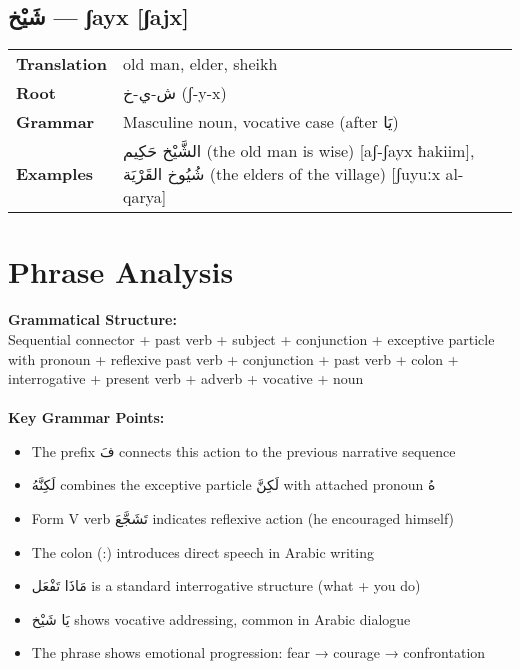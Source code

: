 \documentclass[a4paper,12pt]{article}
\begin{document}
\subsection{\textarabic{شَيْخ} — \textbf{ʃayx} [ʃajx]}
\begin{tabular}{p{3cm}p{10cm}}
\toprule
\textbf{Translation} & old man, elder, sheikh \\
\textbf{Root} & \textarabic{ش-ي-خ} (ʃ-y-x) \\
\textbf{Grammar} & Masculine noun, vocative case (after \textarabic{يَا}) \\
\textbf{Examples} & \textarabic{الشَّيْخ حَكِيم} (the old man is wise) [aʃ-ʃayx ħakiim], \textarabic{شُيُوخ القَرْيَة} (the elders of the village) [ʃuyuːx al-qarya] \\
\bottomrule
\end{tabular}

\section{Phrase Analysis}

\begin{tcolorbox}[colback=boxcolor,colframe=headercolor]
\textbf{Grammatical Structure:}\\
Sequential connector + past verb + subject + conjunction + exceptive particle with pronoun + reflexive past verb + conjunction + past verb + colon + interrogative + present verb + adverb + vocative + noun \\
\\
\textbf{Key Grammar Points:}
\begin{itemize}
\item The prefix \textarabic{فَ} connects this action to the previous narrative sequence
\item \textarabic{لَكِنَّهُ} combines the exceptive particle \textarabic{لَكِنَّ} with attached pronoun \textarabic{هُ}
\item Form V verb \textarabic{تَشَجَّعَ} indicates reflexive action (he encouraged himself)
\item The colon (:) introduces direct speech in Arabic writing
\item \textarabic{مَاذَا تَفْعَل} is a standard interrogative structure (what + you do)
\item \textarabic{يَا شَيْخ} shows vocative addressing, common in Arabic dialogue
\item The phrase shows emotional progression: fear → courage → confrontation
\end{itemize}
\end{tcolorbox}
\end{document}
